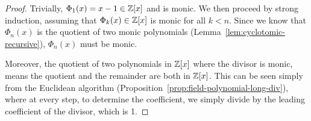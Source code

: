 \begin{proof}
    Trivially, \(\Phi_1(x) = x - 1 \in \mathbb{Z}[x]\) and is monic.
    We then proceed by strong induction,
    assuming that \(\Phi_k(x) \in \mathbb{Z}[x]\) is monic for all \(k < n\).
    Since we know that \(\Phi_n(x)\) is the quotient of two monic polynomials
    (Lemma~\ref{lem:cyclotomic-recursive}),
    \(\Phi_n(x)\) must be monic.

    Moreover, the quotient of two polynomials in \(\mathbb{Z}[x]\) where the divisor is monic,
    means the quotient and the remainder are both in \(\mathbb{Z}[x]\).
    This can be seen simply from the Euclidean algorithm (Proposition~\ref{prop:field-polynomial-long-div}),
    where at every step, to determine the coefficient,
    we simply divide by the leading coefficient of the divisor, which is 1.
\end{proof}

